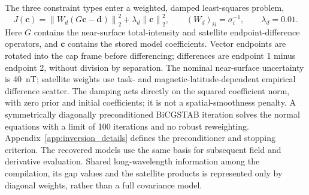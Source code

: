 ﻿\documentclass[11pt,a4paper]{article}
\newcommand{\norm}[1]{\left\lVert#1\right\rVert}
\begin{document}
The three constraint types enter a weighted, damped least-squares problem,
\begin{equation}
 J(\boldsymbol c)=\norm{W_d(G\boldsymbol c-\boldsymbol d)}_2^2
                 +\lambda_d\norm{\boldsymbol c}_2^2,
 \qquad (W_d)_{ii}=\sigma_i^{-1},\qquad\lambda_d=0.01.
 \label{eq:application_objective}
\end{equation}
Here $G$ contains the near-surface total-intensity and satellite endpoint-difference operators, and $\boldsymbol c$ contains the stored model coefficients. Vector endpoints are rotated into the cap frame before differencing; differences are endpoint 1 minus endpoint 2, without division by separation. The nominal near-surface uncertainty is 40~nT; satellite weights use task- and magnetic-latitude-dependent empirical difference scatter. The damping acts directly on the squared coefficient norm, with zero prior and initial coefficients; it is not a spatial-smoothness penalty. A symmetrically diagonally preconditioned BiCGSTAB iteration \citep{vanDerVorst1992} solves the normal equations with a limit of 100 iterations and no robust reweighting. Appendix~\ref{app:inversion_details} defines the preconditioner and stopping criterion. The recovered models use the same basis for subsequent field and derivative evaluation. Shared long-wavelength information among the compilation, its gap values and the satellite products is represented only by diagonal weights, rather than a full covariance model.
\end{document}
